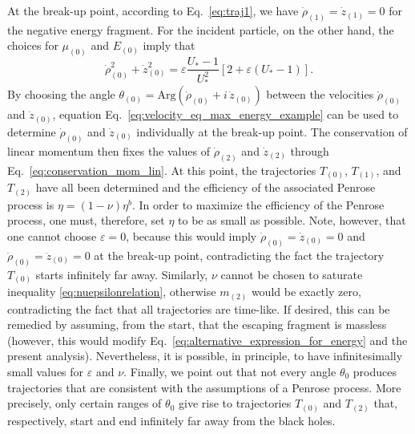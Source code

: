 At the break-up point, according to Eq.~\eqref{eq:traj1}, we have $\dot \rho_{(1)}=\dot z_{(1)} = 0$ for the negative energy fragment. For the incident particle, on the other hand, the choices for $\mu_{(0)}$ and $E_{(0)}$ imply that
\begin{equation}\label{eq:velocity_eq_max_energy_example}
    \dot \rho_{(0)} ^2 + \dot z_{(0)} ^2 = \varepsilon \frac{U_*-1}{U_* ^2} \left[2 + \varepsilon (U_* - 1) \right].
\end{equation}
By choosing the angle $\theta_{(0)} = \mathrm{Arg}\left(\dot \rho_{(0)} + i \, \dot z_{(0)} \right)$ between the velocities $\dot \rho_{(0)}$ and $\dot z_{(0)}$, equation Eq.~\eqref{eq:velocity_eq_max_energy_example} can be used to determine $\dot \rho_{(0)}$ and $\dot z_{(0)}$ individually at the break-up point. The conservation of linear momentum then fixes the values of $\dot \rho_{(2)}$ and $\dot z_{(2)}$ through Eq.~\eqref{eq:conservation_mom_lin}. At this point, the trajectories $T_{(0)}$, $T_{(1)}$, and $T_{(2)}$ have all been determined and the efficiency of the associated Penrose process is $\eta=(1-\nu)\eta^{b}$.  In order to maximize the efficiency of the Penrose process, one must, therefore, set $\eta$ to be as small as possible. Note, however, that one cannot choose $\varepsilon=0$, because this would imply $\dot \rho_{(0)} = \dot z_{(0)} = 0$ and  $\ddot \rho_{(0)} = \ddot z_{(0)} = 0$ at the break-up point, contradicting the fact the trajectory $T_{(0)}$ starts infinitely far away. Similarly, $\nu$ cannot be chosen to saturate inequality \eqref{eq:nuepsilonrelation}, otherwise $m_{(2)}$ would be exactly zero, contradicting the fact that all trajectories are time-like. If desired, this can be remedied by assuming, from the start, that the escaping fragment is massless (however, this would modify Eq.~\eqref{eq:alternative_expression_for_energy} and the present analysis). Nevertheless, it is possible, in principle, to have infinitesimally small values for $\varepsilon$ and $\nu$. Finally, we point out that not every angle $\theta_0$ produces trajectories that are consistent with the assumptions of a Penrose process. More precisely, only certain ranges of $\theta_0$ give rise to trajectories  $T_{(0)}$ and $T_{(2)}$ that, respectively, start and end infinitely far away from the black holes.

